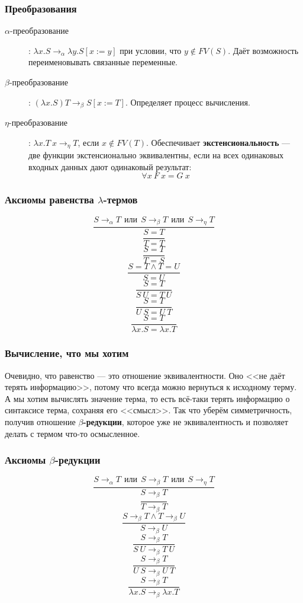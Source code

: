 \documentclass[xetex,mathserif,serif]{beamer}
\begin{document}
	\begin{frame}
		\frametitle{Преобразования}
		\begin{description}
			\item [$\alpha$-преобразование]: $\lambda x.S \rightarrow_\alpha 
					\lambda y.S[x := y]$ при условии, что $y \notin FV(S)$. 
					Даёт возможность переименовывать связанные переменные.
			\item [$\beta$-преобразование]: $(\lambda x.S) T \rightarrow_\beta S[x := T]$.
					Определяет процесс вычисления.
			\item [$\eta$-преобразование]: $\lambda x.T\ x \rightarrow_\eta T$, 
					если $x \notin FV(T)$. Обеспечивает	\textbf{экстенсиональность} 
					--- две функции экстенсионально эквивалентны, если на всех
					одинаковых входных данных дают одинаковый результат:
					$$\forall x\ F\ x = G\ x$$
		\end{description}
	\end{frame}

	\begin{frame}
		\frametitle{Аксиомы равенства $\lambda$-термов}
		$$\dfrac{S \rightarrow_\alpha T\ \ 
			\mbox{или}\ \ S \rightarrow_\beta T\ \ 
			\mbox{или}\ \  S \rightarrow_\eta T}{S = T}$$
		$$\dfrac{}{T = T}$$
		$$\dfrac{S = T}{T = S}$$
		$$\dfrac{S = T \wedge T = U}{S = U}$$
		$$\dfrac{S = T}{S\ U = T\ U}$$
		$$\dfrac{S = T}{U\ S = U\ T}$$
		$$\dfrac{S = T}{\lambda x.S = \lambda x.T}$$
	\end{frame}
	
	\begin{frame}
		\frametitle{Вычисление, что мы хотим}
		Очевидно, что равенство --- это отношение эквивалентности. Оно <<не даёт терять
		информацию>>, потому что всегда можно вернуться к исходному терму. А мы хотим 
		вычислять значение терма, то есть всё-таки терять информацию о синтаксисе 
		терма, сохраняя	его <<смысл>>. Так что уберём симметричность, получив 
		отношение \textbf{$\beta$-редукции}, которое уже не эквивалентность и позволяет 
		делать с термом что-то осмысленное.
	\end{frame}

	\begin{frame}
		\frametitle{Аксиомы $\beta$-редукции}
		$$\dfrac{S \rightarrow_\alpha T\ \ 
			\mbox{или}\ \ S \rightarrow_\beta T\ \ 
			\mbox{или}\ \  S \rightarrow_\eta T}{S \rightarrow_\beta T}$$ 
		$$\dfrac{}{T \rightarrow_\beta T}$$
		$$\dfrac{S \rightarrow_\beta T \wedge T \rightarrow_\beta U}{S \rightarrow_\beta U}$$
		$$\dfrac{S \rightarrow_\beta T}{S\ U \rightarrow_\beta T\ U}$$
		$$\dfrac{S \rightarrow_\beta T}{U\ S \rightarrow_\beta U\ T}$$
		$$\dfrac{S \rightarrow_\beta T}{\lambda x.S \rightarrow_\beta \lambda x.T}$$
	\end{frame}
\end{document}
